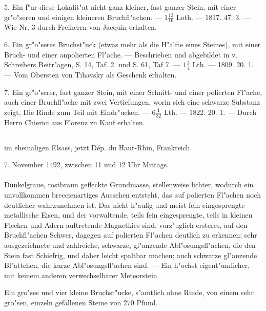\documentclass[a4paper, 11pt, oneside, polutonikogreek, german]{article}
\begin{document}
5. Ein f"ur diese Lokalit"at nicht ganz kleiner, fast ganzer Stein, mit einer gr"o"seren und einigen kleineren Bruchfl"achen. --- $\mathfrak{1\frac{13}{16}}$ Loth. --- 1817. 47. 3. --- Wie Nr. 3 durch Freiherrn von Jacquin erhalten.

6. Ein gr"o"seres Bruchst"uck (etwas mehr als die H"alfte eines Steines), mit einer Bruch- und einer anpolierten Fl"ache. --- Beschrieben und abgebildet in v. Schreibers Beitr"agen, S. 14, Taf. 2. und S. 61, Taf 7. --- $\mathfrak{1\frac{3}{4}}$ Lth. --- 1809. 20. 1. --- Vom Obersten von Tihavsky als Geschenk erhalten.

7. Ein gr"o"serer, fast ganzer Stein, mit einer Schnitt- und einer polierten Fl"ache, auch einer Bruchfl"ache mit zwei Vertiefungen, worin sich eine schwarze Substanz zeigt, Die Rinde zum Teil mit Eindr"ucken. --- $\mathfrak{6\frac{1}{32}}$ Lth. --- 1822. 20. 1. --- Durch Herrn Chierici aus Florenz zu Kauf erhalten.
\subsection[\swabfamily {Ensisheim.}]{}
\begin{center}

im ehemaligen Elsass, jetzt Dép. du Haut-Rhin, Frankreich.

7. November 1492, zwischen 11 und 12 Uhr Mittags.
\end{center}
\paragraph{}
Dunkelgraue, rostbraun gefleckte Grundmasse, stellenweise lichter, wodurch ein unvollkommen breccienartiges Aussehen entsteht, das auf polierten Fl"achen noch deutlicher wahrzunehmen ist. Das nicht h"aufig und meist fein eingesprengte metallische Eisen, und der vorwaltende, teils fein eingesprengte, teils in kleinen Flecken und Adern auftretende Magnetkies sind, vorz"uglich ersteres, auf den Bruchfl"achen Schwer, dagegen auf polierten Fl"achen deutlich zu erkennen; sehr ausgezeichnete und zahlreiche, schwarze, gl"anzende Abl"osungsfl"achen, die den Stein fast Schiefrig, und daher leicht spaltbar machen; auch schwarze gl"anzende Bl"attchen‚ die kurze Abl"osungsfl"achen sind. --- Ein h"ochst eigent"umlicher, mit keinem anderen verwechselbarer Meteorstein.

Ein gro"ses und vier kleine Bruchst"ucke, s"amtlich ohne Rinde, von einem sehr gro"sen, einzeln gefallenen Steine von 270 Pfund.
\end{document}
